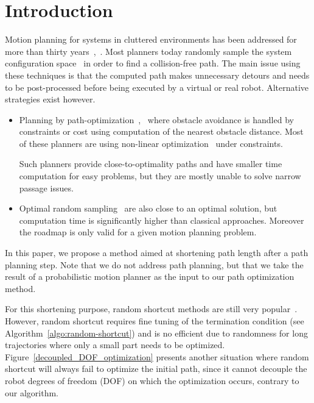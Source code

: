 \documentclass{tADR2e}
\begin{document}
\section{Introduction}

Motion planning for systems in cluttered environments has been addressed for more
than thirty years~\citep{ref-motionplan},~\citep{ref-pianomover}. Most planners
today randomly sample the system configuration space~\cite{ref-spaceconfig} in
order to find a collision-free path. The main issue using these techniques is
 that the computed path makes unnecessary detours and needs to be post-processed 
 before being executed by a virtual or real robot. Alternative
strategies exist however.
\begin{itemize}
\item Planning by path-optimization~\cite{itomp2012},~\cite{voronoiOMP} where
obstacle avoidance is handled by constraints or cost using computation of the
nearest obstacle distance. Most of these planners are using non-linear
optimization~\cite{BettsNonlinopt} under constraints.
   
Such planners provide close-to-optimality paths and have smaller time computation
for easy problems, but they are mostly unable to solve narrow passage issues.
 
\item Optimal random sampling~\cite{KaramanPRMstarRRTstar} are also close to an
optimal solution, but computation time is significantly higher than classical
approaches. Moreover the roadmap is only valid for a given motion planning
   problem. 
\end{itemize}

In this paper, we propose a method aimed at shortening path length after a path
planning step. Note that we do not address path planning, but that we take the
result of a probabilistic motion planner as the input to our path optimization 
method.

For this shortening purpose, random shortcut methods are
still very popular~\cite{Sekhavat-Svestka1998,HauserFastSmooth}. However, random 
shortcut requires fine tuning of the termination condition (see 
Algorithm~\ref{algo:random-shortcut}) and is no efficient due to randomness for long trajectories where only a small part needs to be optimized. Figure~\ref{decoupled_DOF_optimization} presents another situation where random shortcut will always fail to optimize the initial path, since it cannot decouple the robot degrees of freedom (DOF) on which the optimization occurs, contrary to our algorithm.
\end{document}

